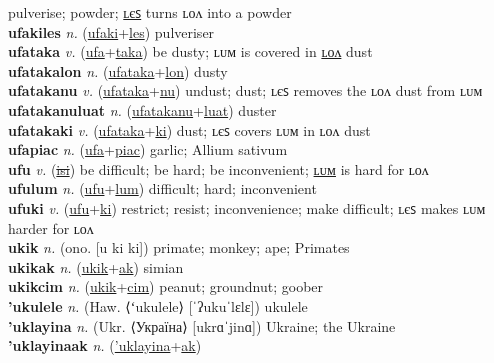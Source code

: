 pulverise; powder; \hyperref[ufakiles]{ʟєꜱ} turns ʟᴏᴧ into a powder \label{ufaki} \\
\textbf{ufakiles} \textit{n.} (\hyperref[ufaki]{ufaki}+\hyperref[les]{les})
pulveriser \label{ufakiles} \\
\textbf{ufataka} \textit{v.} (\hyperref[ufa]{ufa}+\hyperref[taka]{taka})
be dusty; ʟᴜᴍ is covered in \hyperref[ufatakalon]{ʟᴏᴧ} dust \label{ufataka} \\
\textbf{ufatakalon} \textit{n.} (\hyperref[ufataka]{ufataka}+\hyperref[lon]{lon})
dusty \label{ufatakalon} \\
\textbf{ufatakanu} \textit{v.} (\hyperref[ufataka]{ufataka}+\hyperref[nu]{nu})
undust; dust; ʟєꜱ removes the ʟᴏᴧ dust from ʟᴜᴍ \label{ufatakanu} \\
\textbf{ufatakanuluat} \textit{n.} (\hyperref[ufatakanu]{ufatakanu}+\hyperref[luat]{luat})
duster \label{ufatakanuluat} \\
\textbf{ufatakaki} \textit{v.} (\hyperref[ufataka]{ufataka}+\hyperref[ki]{ki})
dust; ʟєꜱ covers ʟᴜᴍ in ʟᴏᴧ dust \label{ufatakaki} \\
\textbf{ufapiac} \textit{n.} (\hyperref[ufa]{ufa}+\hyperref[piac]{piac})
garlic; Allium sativum \label{ufapiac} \\
\textbf{ufu} \textit{v.} (\hyperref[isi]{\sout{isi}})
be difficult; be hard; be inconvenient; \hyperref[ufulum]{ʟᴜᴍ} is hard for ʟᴏᴧ \label{ufu} \\
\textbf{ufulum} \textit{n.} (\hyperref[ufu]{ufu}+\hyperref[lum]{lum})
difficult; hard; inconvenient \label{ufulum} \\
\textbf{ufuki} \textit{v.} (\hyperref[ufu]{ufu}+\hyperref[ki]{ki})
restrict; resist; inconvenience; make difficult; ʟєꜱ makes ʟᴜᴍ harder for ʟᴏᴧ \label{ufuki} \\
\textbf{ukik} \textit{n.} (ono. [u ki ki])
primate; monkey; ape; Primates \label{ukik} \\
\textbf{ukikak} \textit{n.} (\hyperref[ukik]{ukik}+\hyperref[ak]{ak})
simian \label{ukikak} \\
\textbf{ukikcim} \textit{n.} (\hyperref[ukik]{ukik}+\hyperref[cim]{cim})
peanut; groundnut; goober \label{ukikcim} \\
\textbf{'ukulele} \textit{n.} (Haw. ⟨ʻukulele⟩ [ˈʔukuˈlɛlɛ])
ukulele \label{'ukulele} \\
\textbf{'uklayina} \textit{n.} (Ukr. ⟨Україна⟩ [ukrɑˈjinɑ])
Ukraine; the Ukraine \label{'uklayina} \\
\textbf{'uklayinaak} \textit{n.} (\hyperref['uklayina]{'uklayina}+\hyperref[ak]{ak})
